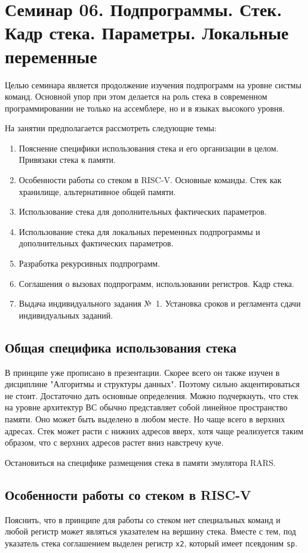 \chapter[Подпрограммы. Окончание]{Семинар 06. Подпрограммы. Стек. Кадр стека. Параметры. Локальные переменные}

Целью семинара является продолжение изучения подпрограмм на уровне систмы команд. Основной упор при этом делается на роль стека в современном программировании не только на ассемблере, но и в языках высокого уровня.

На занятии предполагается рассмотреть следующие темы:
\begin{enumerate}
    \item Пояснение специфики использования стека и его организации в целом. Привязаки стека к памяти.
    \item Особенности работы со стеком в RISC-V. Основные команды. Стек как хранилище, альтернативное общей памяти.
    \item Использование стека для дополнительных фактических параметров.
    \item Использование стека для локальных переменных подпрограммы и дополнительных фактических параметров.
    \item Разработка рекурсивных подпрограмм.
    \item Соглашения о вызовах подпрограмм, использовании регистров. Кадр стека.
    \item Выдача индивидуального задания №~1. Установка сроков и регламента сдачи индивидуальных заданий.
\end{enumerate}

\section{Общая специфика использования стека}
В принципе уже прописано в презентации. Скорее всего он также изучен в дисциплине "Алгоритмы и структуры данных". Поэтому сильно акцентироваться не стоит. Достаточно дать основные определения. Можно подчеркнуть, что стек на уровне архитектур ВС обычно представляет собой линейное пространство памяти. Оно может быть выделено в любом месте. Но чаще всего в верхних адресах. Стек может расти с нижних адресов вверх, хотя чаще реализуется таким образом, что с верхних адресов растет вниз навстречу куче.

Остановиться на специфике размещения стека в памяти эмулятора RARS.

\section{Особенности работы со стеком в RISC-V}
Пояснить, что в принципе для работы со стеком нет специальных команд и любой регистр может являться указателем на вершину стека. Вместе с тем, под указатель стека соглашением выделен регистр \verb|x2|, который имеет псевдоним \verb|sp|.

